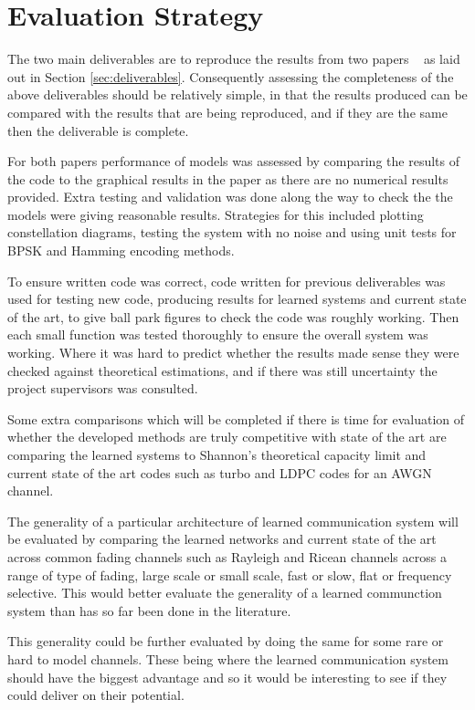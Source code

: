 \documentclass[12pt,onecolumn,letterpaper]{article}
\begin{document}
\FloatBarrier
\section{Evaluation Strategy}

The two main deliverables are to reproduce the results from two papers ~\cite{oShea,Aoudia} as laid out in Section \ref{sec:deliverables}. Consequently assessing the completeness of the above deliverables should be relatively simple, in that the results produced can be compared with the results that are being reproduced, and if they are the same then the deliverable is complete.

For both papers performance of models was assessed by comparing the results of the code to the graphical results in the paper as there are no numerical results provided. Extra testing and validation was done along the way to check the the models were giving reasonable results. Strategies for this included plotting constellation diagrams, testing the system with no noise and using unit tests for BPSK and Hamming encoding methods.

To ensure written code was correct, code written for previous deliverables was used for testing new code, producing results for learned systems and current state of the art, to give ball park figures to check the code was roughly working. Then each small function was tested thoroughly to ensure the overall system was working. Where it was hard to predict whether the results made sense they were checked against theoretical estimations, and if there was still uncertainty the project supervisors was consulted. 

Some extra comparisons which will be completed if there is time for evaluation of whether the developed methods are truly competitive with state of the art are comparing the learned systems to Shannon's theoretical capacity limit and current state of the art codes such as turbo and LDPC codes for an AWGN channel.

The generality of a particular architecture of learned communication system will be evaluated by comparing the learned networks and current state of the art across common fading channels such as Rayleigh and Ricean channels across a range of type of fading, large scale or small scale, fast or slow, flat or frequency selective. This would better evaluate the generality of a learned communction system than has so far been done in the literature.

This generality could be further evaluated by doing the same for some rare or hard to model channels. These being where the learned communication system should have the biggest advantage and so it would be interesting to see if they could deliver on their potential.
\end{document}
